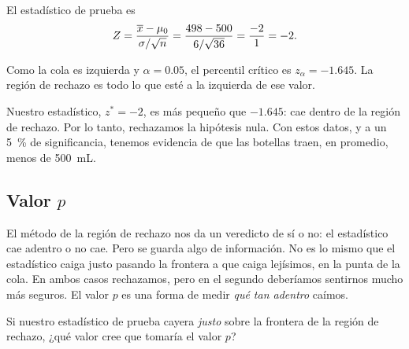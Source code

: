 El estadístico de prueba es \[Z = \frac{\overline{x}-\mu_0}{\sigma/\sqrt{n}} = \frac{498-500}{6/\sqrt{36}} = \frac{-2}{1} = -2.\]

Como la cola es izquierda y \(\alpha=\num{0,05}\), el percentil crítico es \(z_\alpha=-\num{1,645}\). La región de rechazo es todo lo que esté a la izquierda de ese valor.


Nuestro estadístico, \(z^*=-2\), es más pequeño que \(-\num{1,645}\): cae dentro de la región de rechazo. Por lo tanto, rechazamos la hipótesis nula. Con estos datos, y a un \qty{5}{\percent} de significancia, tenemos evidencia de que las botellas traen, en promedio, menos de \qty{500}{\milli\liter}.

\subsection{Valor \texorpdfstring{\(p\)}{p}}

El método de la región de rechazo nos da un veredicto de sí o no: el estadístico cae adentro o no cae. Pero se guarda algo de información. No es lo mismo que el estadístico caiga justo pasando la frontera a que caiga lejísimos, en la punta de la cola. En ambos casos rechazamos, pero en el segundo deberíamos sentirnos mucho más seguros. El valor \(p\) es una forma de medir \emph{qué tan adentro} caímos.

\begin{pausa}
Si nuestro estadístico de prueba cayera \emph{justo} sobre la frontera de la región de rechazo, ¿qué valor cree que tomaría el valor \(p\)?
\end{pausa}

